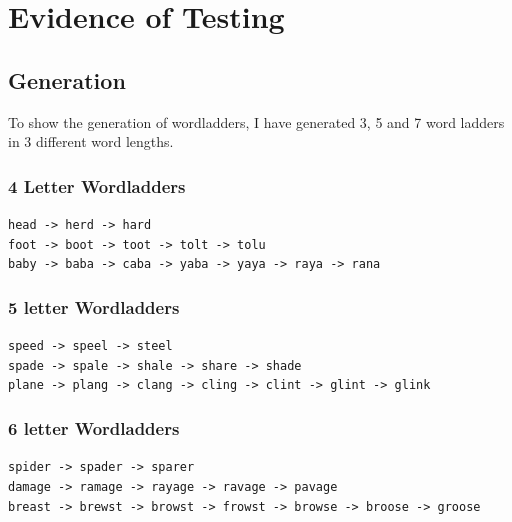 \documentclass[10pt, a4paper]{article}
\begin{document}
\section{Evidence of Testing}

\subsection{Generation}

To show the generation of wordladders, I have generated 3, 5 and 7 word ladders in 3 different word lengths.

\subsubsection{4 Letter Wordladders}

\hspace*{0.15in}
\texttt{head -> herd -> hard}\\

\texttt{foot -> boot -> toot -> tolt -> tolu}\\

\texttt{baby -> baba -> caba -> yaba -> yaya -> raya -> rana}\\

\subsubsection{5 letter Wordladders}
\hspace*{0.15in}
\texttt{speed -> speel -> steel}\\

\texttt{spade -> spale -> shale -> share -> shade}\\

\texttt{plane -> plang -> clang -> cling -> clint -> glint -> glink}\\

\subsubsection{6 letter Wordladders}
\hspace*{0.15in}
\texttt{spider -> spader -> sparer}\\

\texttt{damage -> ramage -> rayage -> ravage -> pavage}\\

\texttt{breast -> brewst -> browst -> frowst -> browse -> broose -> groose}\\
\end{document}
